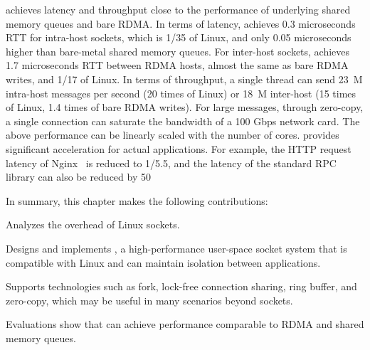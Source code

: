 
\sys {} achieves latency and throughput close to the performance of underlying shared memory queues and bare RDMA.
In terms of latency, \sys {} achieves 0.3 microseconds RTT for intra-host sockets, which is 1/35 of Linux, and only 0.05 microseconds higher than bare-metal shared memory queues. For inter-host sockets, \sys {} achieves 1.7 microseconds RTT between RDMA hosts, almost the same as bare RDMA writes, and 1/17 of Linux.
In terms of throughput, a single thread can send 23~M intra-host messages per second (20 times of Linux) or 18~M inter-host (15 times of Linux, 1.4 times of bare RDMA writes).
For large messages, through zero-copy, a single connection can saturate the bandwidth of a 100 Gbps network card.
The above performance can be linearly scaled with the number of cores.
\sys {} provides significant acceleration for actual applications.
For example, the HTTP request latency of Nginx~\cite{nginx} is reduced to 1/5.5, and the latency of the standard RPC library can also be reduced by 50%

In summary, this chapter makes the following contributions:
\begin{ecompact}
\item Analyzes the overhead of Linux sockets.
\item Designs and implements \sys {}, a high-performance user-space socket system that is compatible with Linux and can maintain isolation between applications.
\item Supports technologies such as fork, lock-free connection sharing, ring buffer, and zero-copy, which may be useful in many scenarios beyond sockets.
\item Evaluations show that \sys {} can achieve performance comparable to RDMA and shared memory queues.
\end{ecompact}

